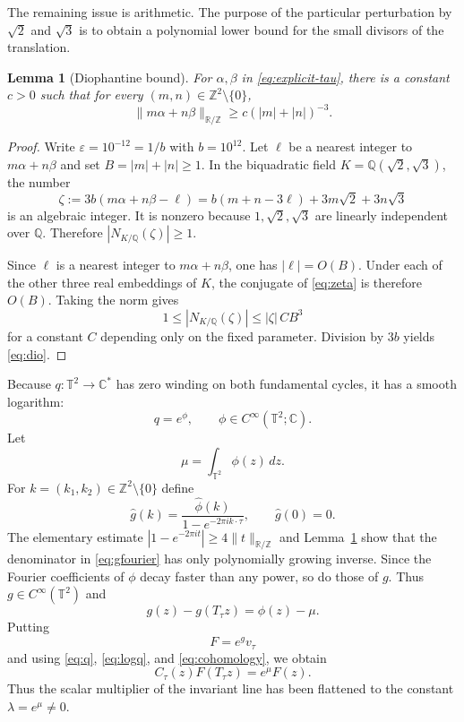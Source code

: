 \documentclass[11pt]{amsart}
\newtheorem{lemma}[theorem]{Lemma}
\theoremstyle{remark}
\newcommand{\R}{\mathbb R}
\newcommand{\C}{\mathbb C}
\newcommand{\Z}{\mathbb Z}
\newcommand{\Q}{\mathbb Q}
\newcommand{\T}{\mathbb T}
\begin{document}
The remaining issue is arithmetic.  The purpose of the particular
perturbation by $\sqrt2$ and $\sqrt3$ is to obtain a polynomial lower bound
for the small divisors of the translation.

\begin{lemma}[Diophantine bound]\label{lem:dio}
For $\alpha,\beta$ in \eqref{eq:explicit-tau}, there is a constant $c>0$ such
that for every $(m,n)\in\Z^2\setminus\{0\}$,
\begin{equation}\label{eq:dio}
 \|m\alpha+n\beta\|_{\R/\Z}
 \ge c(|m|+|n|)^{-3}.
\end{equation}
\end{lemma}

\begin{proof}
Write $\varepsilon=10^{-12}=1/b$ with $b=10^{12}$.  Let $\ell$ be a nearest
integer to $m\alpha+n\beta$ and set $B=|m|+|n|\ge1$.  In the biquadratic field
$K=\Q(\sqrt2,\sqrt3)$, the number
\begin{equation}\label{eq:zeta}
 \zeta:=3b(m\alpha+n\beta-\ell)
 =b(m+n-3\ell)+3m\sqrt2+3n\sqrt3
\end{equation}
is an algebraic integer.  It is nonzero because
$1,\sqrt2,\sqrt3$ are linearly independent over $\Q$.  Therefore
$|N_{K/\Q}(\zeta)|\ge1$.

Since $\ell$ is a nearest integer to $m\alpha+n\beta$, one has
$|\ell|=O(B)$.  Under each of the other three real embeddings of $K$, the
conjugate of \eqref{eq:zeta} is therefore $O(B)$.  Taking the norm gives
\[
 1\le |N_{K/\Q}(\zeta)|\le |\zeta|\,C B^3
\]
for a constant $C$ depending only on the fixed parameter.  Division by $3b$
yields \eqref{eq:dio}.
\end{proof}

Because $q:\T^2\to\C^*$ has zero winding on both fundamental cycles, it has a
smooth logarithm:
\begin{equation}\label{eq:logq}
 q=e^\phi,
 \qquad
 \phi\in C^\infty(\T^2;\C).
\end{equation}
Let
\[
 \mu=\int_{\T^2}\phi(z)\,dz.
\]
For $k=(k_1,k_2)\in\Z^2\setminus\{0\}$ define
\begin{equation}\label{eq:gfourier}
 \widehat g(k)
 =\frac{\widehat\phi(k)}{1-e^{-2\pi i k\cdot\tau}},
 \qquad
 \widehat g(0)=0.
\end{equation}
The elementary estimate
$|1-e^{-2\pi it}|\ge4\|t\|_{\R/\Z}$ and
Lemma~\ref{lem:dio} show that the denominator in \eqref{eq:gfourier} has only
polynomially growing inverse.  Since the Fourier coefficients of $\phi$
decay faster than any power, so do those of $g$.  Thus
$g\in C^\infty(\T^2)$ and
\begin{equation}\label{eq:cohomology}
 g(z)-g(T_\tau z)=\phi(z)-\mu.
\end{equation}
Putting
\begin{equation}\label{eq:F}
 F=e^g v_\tau
\end{equation}
and using \eqref{eq:q}, \eqref{eq:logq}, and \eqref{eq:cohomology}, we obtain
\begin{equation}\label{eq:flat}
 C_\tau(z)F(T_\tau z)=e^\mu F(z).
\end{equation}
Thus the scalar multiplier of the invariant line has been flattened to the
constant $\lambda=e^\mu\ne0$.
\end{document}
